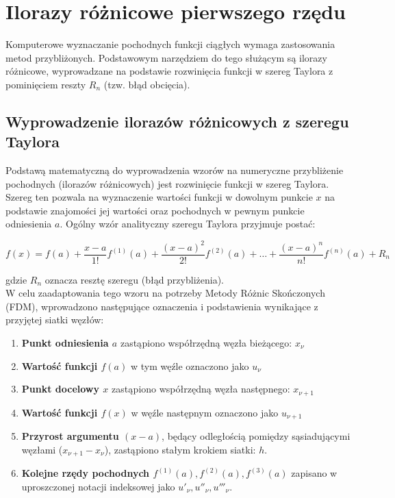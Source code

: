 \documentclass[a4paper,14pt]{scrartcl}
\begin{document}
\newpage

\section{Ilorazy różnicowe pierwszego rzędu}
Komputerowe wyznaczanie pochodnych funkcji ciągłych wymaga zastosowania metod przybliżonych. Podstawowym narzędziem do tego służącym są ilorazy różnicowe, wyprowadzane na podstawie rozwinięcia funkcji w szereg Taylora z pominięciem reszty $R_n$ (tzw. błąd obcięcia).


\subsection{Wyprowadzenie ilorazów różnicowych z szeregu Taylora}
Podstawą matematyczną do wyprowadzenia wzorów na numeryczne przybliżenie pochodnych (ilorazów różnicowych) jest rozwinięcie funkcji w szereg Taylora.
Szereg ten pozwala na wyznaczenie wartości funkcji w dowolnym punkcie $x$ na podstawie znajomości jej wartości oraz pochodnych w pewnym punkcie odniesienia $a$.
Ogólny wzór analityczny szeregu Taylora przyjmuje postać:


\begin{equation*}
    f(x) = f(a) + \frac{x-a}{1!}f^{(1)}(a) + \frac{(x-a)^2}{2!}f^{(2)}(a) + \dots + \frac{(x-a)^n}{n!}f^{(n)}(a) + R_n
\end{equation*}

gdzie $R_n$ oznacza resztę szeregu (błąd przybliżenia). \\

W celu zaadaptowania tego wzoru na potrzeby Metody Różnic Skończonych (FDM), wprowadzono następujące oznaczenia i podstawienia wynikające z przyjętej siatki węzłów:

\begin{enumerate}
    \item \textbf{Punkt odniesienia $a$} zastąpiono współrzędną węzła bieżącego: $x_\nu$
    \item \textbf{Wartość funkcji $f(a)$} w tym węźle oznaczono jako $u_\nu$
    \item \textbf{Punkt docelowy $x$} zastąpiono współrzędną węzła następnego: $x_{\nu+1}$
    \item \textbf{Wartość funkcji $f(x)$} w węźle następnym oznaczono jako $u_{\nu+1}$
    \item \textbf{Przyrost argumentu $(x - a)$}, będący odległością pomiędzy sąsiadującymi węzłami ($x_{\nu+1} - x_\nu$), zastąpiono stałym krokiem siatki: $h$.
    \item \textbf{Kolejne rzędy pochodnych $f^{(1)}(a), f^{(2)}(a), f^{(3)}(a)$} zapisano w uproszczonej notacji indeksowej jako $u'_\nu, u''_\nu, u'''_\nu$.
\end{enumerate}
\end{document}
